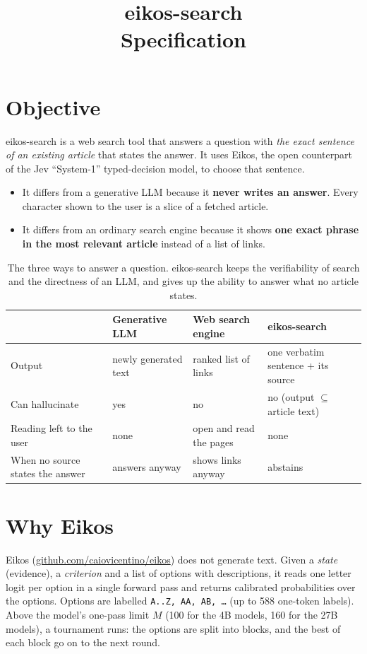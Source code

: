 \documentclass[11pt,a4paper]{article}
\title{\textbf{eikos-search}\\[2pt]\large Specification}
\author{}
\date{}
\newcommand{\code}[1]{\texttt{#1}}
\begin{document}
\maketitle

\section{Objective}

eikos-search is a web search tool that answers a question with \emph{the exact sentence of an existing article} that
states the answer. It uses Eikos, the open counterpart of the Jev ``System-1'' typed-decision model, to choose that
sentence.
\begin{itemize}
  \item It differs from a generative LLM because it \textbf{never writes an answer}. Every character shown to the user
        is a slice of a fetched article.
  \item It differs from an ordinary search engine because it shows \textbf{one exact phrase in the most relevant
        article} instead of a list of links.
\end{itemize}

\begin{table}[htbp]
\centering
\caption{The three ways to answer a question. eikos-search keeps the verifiability of search and the directness of
an LLM, and gives up the ability to answer what no article states.}
\label{tab:position}
\begin{tabularx}{\linewidth}{@{}p{30mm}YYY@{}}
\toprule
 & Generative LLM & Web search engine & \textbf{eikos-search} \\
\midrule
Output & newly generated text & ranked list of links & one verbatim sentence + its source \\
Can hallucinate & yes & no & no (output $\subseteq$ article text) \\
Reading left to the user & none & open and read the pages & none \\
When no source states the answer & answers anyway & shows links anyway & abstains \\
\bottomrule
\end{tabularx}
\end{table}

\section{Why Eikos}

Eikos (\href{https://github.com/caiovicentino/eikos}{github.com/caiovicentino/eikos}) does not generate text. Given a
\emph{state} (evidence), a \emph{criterion} and a list of options with descriptions, it reads one letter logit per
option in a single forward pass and returns calibrated probabilities over the options. Options are labelled
\code{A..Z, AA, AB, \dots} (up to 588 one-token labels). Above the model's one-pass limit $M$ (100 for the 4B models,
160 for the 27B models), a tournament runs: the options are split into blocks, and the best of each block go on to the
next round.
\end{document}
